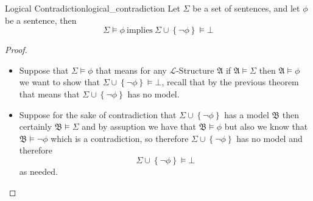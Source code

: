 \begin{proposition}{Logical Contradiction}{logical_contradiction}
    Let $ \Sigma $ be a set of sentences, and let $ \phi  $ be a sentence, then
    \[
    \Sigma \models \phi ~\text{implies}~ \Sigma \cup \left\{ \neg \phi  \right\} \models \bot  
    \]
\end{proposition}
\begin{proof}
    \begin{itemize}
        \item Suppose that $ \Sigma \models \phi  $ that means for any $\mathcal{L}$-Structure $ \mathfrak{ A }   $ if $ \mathfrak{ A } \models \Sigma   $ then $ \mathfrak{ A } \models \phi   $ we want to show that $ \Sigma \cup \left\{ \neg \phi  \right\} \models \bot  $, recall that by the previous theorem that means that $ \Sigma \cup \left\{ \neg \phi  \right\}  $ has no model.
        \item Suppose for the sake of contradiction that $ \Sigma \cup \left\{ \neg \phi  \right\}  $ has a model $ \mathfrak{ B }   $ then certainly $ \mathfrak{ B } \models \Sigma   $ and by assuption we have that $ \mathfrak{ B } \models \phi   $ but also we know that $ \mathfrak{ B } \models \neg \phi   $ which is a contradiction, so therefore $ \Sigma  \cup \left\{ \neg \phi  \right\}  $ has no model and therefore
            \[
            \Sigma \cup \left\{ \neg \phi  \right\} \models \bot 
            \]
            as needed.
    \end{itemize}
\end{proof}

